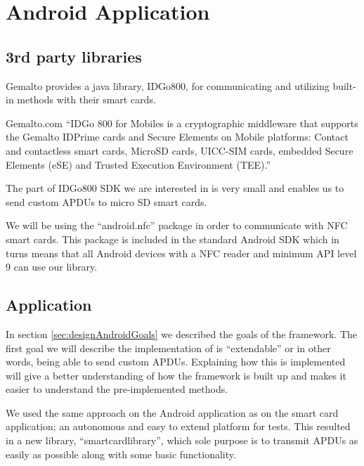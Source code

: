 \section{Android Application}

\subsection{3rd party libraries}
Gemalto provides a java library, IDGo800, for communicating and utilizing built-in methods with their smart cards.

\begin{aquote}{Gemalto.com \cite{GemaltoIDGo800}}
``IDGo 800 for Mobiles is a cryptographic middleware that supports the Gemalto IDPrime cards and Secure Elements on Mobile platforms: Contact and contactless smart cards, MicroSD cards, UICC-SIM cards, embedded Secure Elements (eSE) and Trusted Execution Environment (TEE).''
\end{aquote}

The part of IDGo800 SDK we are interested in is very small and enables us to send custom APDUs to micro SD smart cards.

We will be using the ``android.nfc'' package in order to communicate with NFC smart cards. This package is included in the standard Android SDK which in turns means that all Android devices with a NFC reader and minimum API level 9 \cite{androidNFCminSDK} can use our library.

\subsection{Application}
\label{sec:androidApp}

In section \ref{sec:designAndroidGoals} we described the goals of the framework. The first goal we will describe the implementation of is ``extendable'' or in other words, being able to send custom APDUs. Explaining how this is implemented will give a better understanding of how the framework is built up and makes it easier to understand the pre-implemented methods.

We used the same approach on the Android application as on the smart card application; an autonomous and easy to extend platform for tests. This resulted in a new library, ``smartcardlibrary'',  which sole purpose is to transmit APDUs as easily as possible along with some basic functionality.

